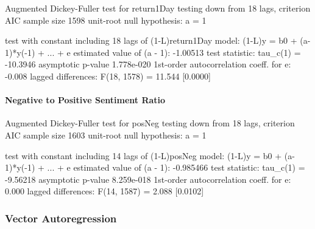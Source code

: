 Augmented Dickey-Fuller test for return1Day
testing down from 18 lags, criterion AIC
sample size 1598
unit-root null hypothesis: a = 1

test with constant 
including 18 lags of (1-L)return1Day
model: (1-L)y = b0 + (a-1)*y(-1) + ... + e
estimated value of (a - 1): -1.00513
test statistic: tau\_c(1) = -10.3946
asymptotic p-value 1.778e-020
1st-order autocorrelation coeff. for e: -0.008
lagged differences: F(18, 1578) = 11.544 [0.0000]

\paragraph{Negative to Positive Sentiment Ratio}

Augmented Dickey-Fuller test for posNeg
testing down from 18 lags, criterion AIC
sample size 1603
unit-root null hypothesis: a = 1

test with constant 
including 14 lags of (1-L)posNeg
model: (1-L)y = b0 + (a-1)*y(-1) + ... + e
estimated value of (a - 1): -0.985466
test statistic: tau\_c(1) = -9.56218
asymptotic p-value 8.259e-018
1st-order autocorrelation coeff. for e: 0.000
lagged differences: F(14, 1587) = 2.088 [0.0102]

\subsubsection{Vector Autoregression}

